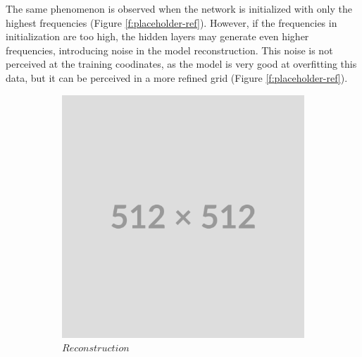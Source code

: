 The same phenomenon is observed when the network is initialized with only the highest  frequencies (Figure \ref{f:placeholder-ref}). However, if the frequencies in initialization are too high, the hidden layers may generate even higher frequencies, introducing noise in the model reconstruction. This noise is not perceived at the training coodinates, as the model is very good at overfitting this data, but it can be perceived in a more refined grid (Figure \ref{f:placeholder-ref}).

\begin{figure}
    \centering
    \begin{subfigure}[b]{0.4\textwidth}
        \centering
        \includegraphics[width=\textwidth]{img/placeholder512.png}
        \caption{$Reconstruction$}
    \end{subfigure}
    \hfill
    \begin{subfigure}[b]{0.4\textwidth}
        \centering

\end{subfigure}
\end{figure}
